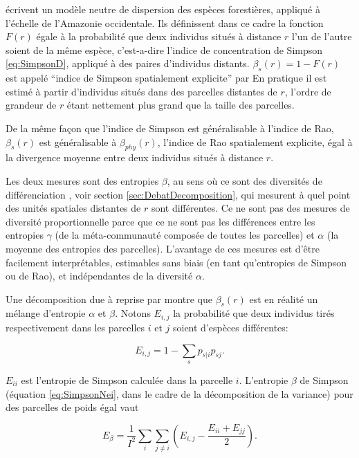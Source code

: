 \documentclass[
  11pt,
  french,
  a4paper,
  extrafontsizes,onecolumn,openright
  ]{memoir}
\begin{document}
\textcite{Chave2002} écrivent un modèle neutre de dispersion des espèces forestières, appliqué à l'échelle de l'Amazonie occidentale\autocite{Condit2002}.
Ils définissent dans ce cadre la fonction \(F(r)\) égale à la probabilité que deux individus situés à distance \(r\) l'un de l'autre soient de la même espèce, c'est-a-dire l'indice de concentration de Simpson \eqref{eq:SimpsonD}, appliqué à des paires d'individus distants.
\(\beta_s(r)=1-F(r)\) est appelé ``indice de Simpson spatialement explicite'' par \textcite{Shen2013}
En pratique il est estimé à partir d'individus situés dans des parcelles distantes de \(r\), l'ordre de grandeur de \(r\) étant nettement plus grand que la taille des parcelles.

De la même façon que l'indice de Simpson est généralisable à l'indice de Rao, \(\beta_s(r)\) est généralisable à \(\beta_{phy}(r)\), l'indice de Rao spatialement explicite, égal à la divergence moyenne entre deux individus situés à distance \(r\).

Les deux mesures sont des entropies \(\beta\), au sens où ce sont des diversités de différenciation \autocite{Jurasinski2009}, voir section \ref{sec:DebatDecomposition}, qui mesurent à quel point des unités spatiales distantes de \(r\) sont différentes.
Ce ne sont pas des mesures de diversité proportionnelle parce que ce ne sont pas les différences entre les entropies \(\gamma\) (de la méta-communauté composée de toutes les parcelles) et \(\alpha\) (la moyenne des entropies des parcelles).
L'avantage de ces mesures est d'être facilement interprétables, estimables sans biais (en tant qu'entropies de Simpson ou de Rao), et indépendantes de la diversité \(\alpha\).

Une décomposition due à \textcite{Nei1973} reprise par \textcite{Chave2007} montre que \(\beta_s(r)\) est en réalité un mélange d'entropie \(\alpha\) et \(\beta\).
Notons \(E_{i,j}\) la probabilité que deux individus tirés respectivement dans les parcelles \(i\) et \(j\) soient d'espèces différentes:

\begin{equation}
  \label{eq:Nei1973}
  E_{i,j} = 1-\sum_{s}{p_{s|i}}{p_{sj}}.
\end{equation}

\(E_{ii}\) est l'entropie de Simpson calculée dans la parcelle \(i\).
L'entropie \(\beta\) de Simpson (équation \eqref{eq:SimpsonNei}, dans le cadre de la décomposition de la variance) pour des parcelles de poids égal vaut

\begin{equation}
  \label{eq:EbetaNei}
  E_{\beta} = \frac{1}{I^2} \sum_{i}\sum_{j\ne i}\left({E_{i,j}-\frac{E_{ii}+E_{jj}}{2}}\right).
\end{equation}
\end{document}
